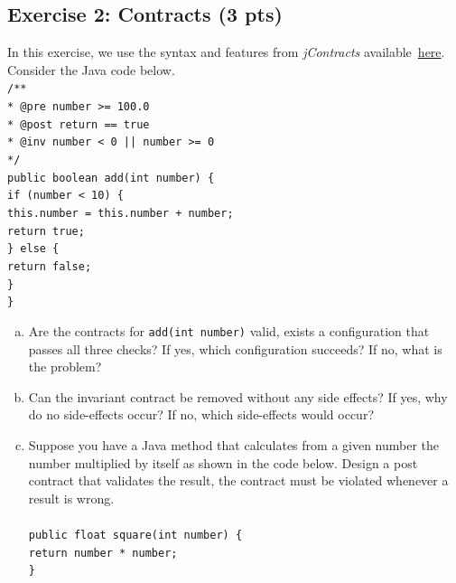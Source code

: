 \documentclass [11pt, a4wide, twoside]{article}
\begin{document}
\subsection*{Exercise 2: Contracts (3 pts)}
In this exercise, we use the syntax and features from \emph{jContracts} available~\href{http://jcontracts.sourceforge.net/}{here}.
Consider the Java code below.\\
\texttt{/**\\
\hspace*{0.225cm}* @pre number >= 100.0\\
\hspace*{0.225cm}* @post return == true\\
\hspace*{0.225cm}* @inv number < 0 || number >= 0\\
\hspace*{0.225cm}*/\\
public boolean add(int number) \{\\
\hspace*{0.5cm}if (number < 10) \{\\
\hspace*{1.0cm}this.number = this.number + number;\\        
\hspace*{1.0cm}return true;\\        
\hspace*{0.5cm}\} else \{\\
\hspace*{1.0cm}return false;\\
\hspace*{0.5cm}\}\\
\}}
\begin{enumerate}[a)]
\item Are the contracts for \texttt{add(int number)} valid, \ie exists a configuration that passes all three checks? If yes, which configuration succeeds? If no, what is the problem?
\item Can the invariant contract be removed without any side effects? If yes, why do no side-effects occur? If no, which side-effects would occur?
\item Suppose you have a Java method that calculates from a given number the number multiplied by itself as shown in the code below. Design a post contract that validates the result, \ie the contract must be violated whenever a result is wrong.\\\\
\texttt{public float square(int number) \{\\
\hspace*{0.5cm}return number * number;\\        
\}}\\\\
\end{enumerate}
\end{document}
